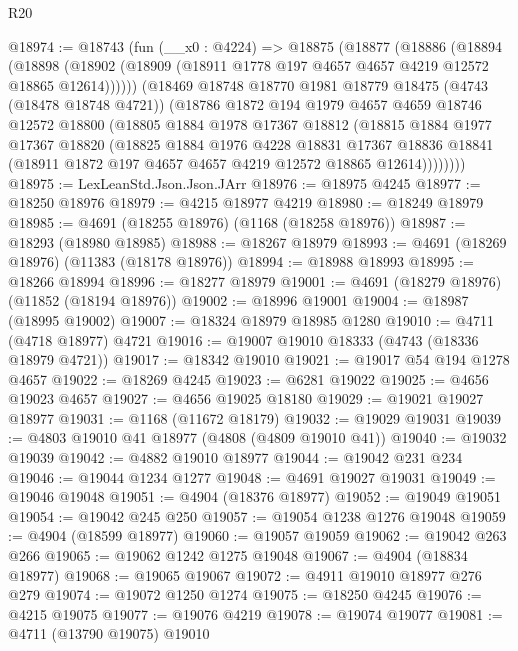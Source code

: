 \begin{lexlean}{R20}
\begin{coremodule}
@18974 := @18743
    (fun (__x0 : @4224) =>
    @18875
      (@18877
        (@18886
          (@18894
            (@18898 (@18902 (@18909 (@18911 @1778 @197 @4657 @4657 @4219 @12572 @18865 @12614))))))
        (@18469
          @18748
          @18770
          @1981
          @18779
          @18475
          (@4743 (@18478 @18748 @4721))
          (@18786
            @1872
            @194
            @1979
            @4657
            @4659
            @18746
            @12572
            @18800
            (@18805
              @1884
              @1978
              @17367
              @18812
              (@18815
                @1884
                @1977
                @17367
                @18820
                (@18825
                  @1884
                  @1976
                  @4228
                  @18831
                  @17367
                  @18836
                  @18841
                  (@18911 @1872 @197 @4657 @4657 @4219 @12572 @18865 @12614))))))))
@18975 := LexLeanStd.Json.Json.JArr
@18976 := @18975 @4245
@18977 := @18250 @18976
@18979 := @4215 @18977 @4219
@18980 := @18249 @18979
@18985 := @4691 (@18255 @18976) (@1168 (@18258 @18976))
@18987 := @18293 (@18980 @18985)
@18988 := @18267 @18979
@18993 := @4691 (@18269 @18976) (@11383 (@18178 @18976))
@18994 := @18988 @18993
@18995 := @18266 @18994
@18996 := @18277 @18979
@19001 := @4691 (@18279 @18976) (@11852 (@18194 @18976))
@19002 := @18996 @19001
@19004 := @18987 (@18995 @19002)
@19007 := @18324 @18979 @18985 @1280
@19010 := @4711 (@4718 @18977) @4721
@19016 := @19007 @19010 @18333 (@4743 (@18336 @18979 @4721))
@19017 := @18342 @19010
@19021 := @19017 @54 @194 @1278 @4657
@19022 := @18269 @4245
@19023 := @6281 @19022
@19025 := @4656 @19023 @4657
@19027 := @4656 @19025 @18180
@19029 := @19021 @19027 @18977
@19031 := @1168 (@11672 @18179)
@19032 := @19029 @19031
@19039 := @4803 @19010 @41 @18977 (@4808 (@4809 @19010 @41))
@19040 := @19032 @19039
@19042 := @4882 @19010 @18977
@19044 := @19042 @231 @234
@19046 := @19044 @1234 @1277
@19048 := @4691 @19027 @19031
@19049 := @19046 @19048
@19051 := @4904 (@18376 @18977)
@19052 := @19049 @19051
@19054 := @19042 @245 @250
@19057 := @19054 @1238 @1276 @19048
@19059 := @4904 (@18599 @18977)
@19060 := @19057 @19059
@19062 := @19042 @263 @266
@19065 := @19062 @1242 @1275 @19048
@19067 := @4904 (@18834 @18977)
@19068 := @19065 @19067
@19072 := @4911 @19010 @18977 @276 @279
@19074 := @19072 @1250 @1274
@19075 := @18250 @4245
@19076 := @4215 @19075
@19077 := @19076 @4219
@19078 := @19074 @19077
@19081 := @4711 (@13790 @19075) @19010

\end{coremodule}
\end{lexlean}
